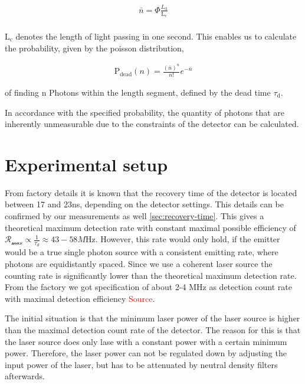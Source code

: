 \begin{align}
    \bar{n} = \Phi \frac{L_{\text{d}}}{\text{L}_{\text{c}}}\\
\end{align}

$\text{L}_{\text{c}}$ denotes the length of light passing in one second.
This enables us to calculate the probability, given by the poisson distribution,

\begin{align}
    \text{P}_{\text{dead}}(n) = \frac{(\bar{n})^n}{n!} e^{-\bar{n}}
\end{align}

of finding n Photons within the length segment, defined by the dead time $\tau_{\text{d}}$.

In accordance with the specified probability, the quantity of photons that are inherently unmeasurable due to the
constraints of the detector can be calculated.


\section{Experimental setup}\label{sec:experimental_setup}

From factory details it is known that the recovery time of the detector is located between 17 and 23ns, depending on the
detector settings.
This details can be confirmed by our measurements as well \ref{sec:recovery-time}.
This gives a theoretical maximum detection rate with constant maximal possible efficiency of $\mathcal{R_{\max}} \propto \frac{1}{\tau_{d}} \approx 43-58\si{M\Hz}$.
However, this rate would only hold, if the emitter would be a true single photon source with a consistent emitting rate, where
photons are equidistantly spaced.
Since we use a coherent laser source the counting rate is significantly lower than the theoretical maximum detection rate.
From the factory we got specification of about 2-4 MHz as detection count rate with maximal detection efficiency \textcolor{red}{Source}.


The initial situation is that the minimum laser power of the laser source is higher than the maximal detection count rate of the detector.
The reason for this is that the laser source does only lase with a constant power with a certain minimum power.
Therefore, the laser power can not be regulated down by adjusting the input power of the laser, but has to be attenuated
by neutral density filters afterwards.

